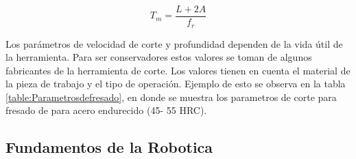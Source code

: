 \begin{equation}
    T_{m}=\frac{L+2A}{f_{r}}
\end{equation}

Los parámetros de velocidad de corte y profundidad dependen de la vida útil de la herramienta. Para ser conservadores estos valores se toman de algunos fabricantes de la herramienta de corte. Los valores tienen en cuenta el material de la pieza de trabajo y el tipo de operación. Ejemplo de esto se observa en la tabla \ref{table:Parametrosdefresado}, en donde se muestra los parametros de corte para fresado de para acero endurecido (45- 55 HRC).



\subsection{Fundamentos de la Robotica}
\label{sec:FundamentosdelaRobotica}
%
%
